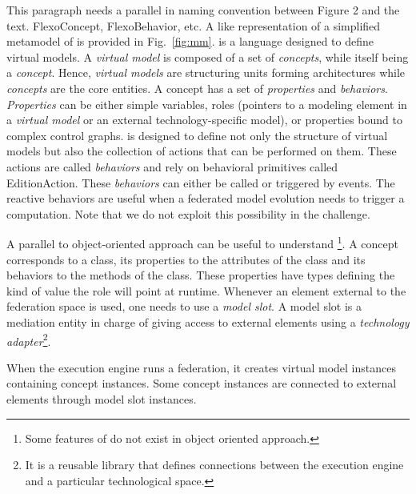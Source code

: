 {\color{red} This paragraph needs a parallel in naming convention between Figure 2 and the text.  FlexoConcept, FlexoBehavior, etc.} A \UML like representation of a simplified metamodel of \FML is provided in Fig.~\ref{fig:mm}. \FML is a language designed to define virtual models. A \emph{virtual model} is composed of a set of \emph{concepts}, while itself being a \emph{concept}. Hence, \emph{virtual models} are structuring units forming architectures while \emph{concepts} are the core entities. A concept has a set of \emph{properties} and \emph{behaviors}. \emph{Properties} can be either simple variables, roles (pointers to a modeling element in a \emph{virtual model} or an external technology-specific model), or properties bound to complex control graphs. \FML is designed to define not only the structure of virtual models but also the collection of actions that can be performed on them. These actions are called \emph{behaviors} and rely on behavioral primitives called \textsf{EditionAction}. These \emph{behaviors} can either be called or triggered by events. The reactive behaviors are useful when a federated model evolution needs to trigger a computation. Note that we do not exploit this possibility in the challenge.

A parallel to object-oriented approach can be useful to understand \FML\footnote{Some features of \FML do not exist in object oriented approach.}. A concept corresponds to a class, its properties to the attributes of the class and its behaviors to the methods of the class. These properties have types defining the kind of value the role will point at runtime. Whenever an element external to the federation space is used, one needs to use a \emph{model slot}. A model slot is a mediation entity in charge of giving access to external elements using a \emph{technology adapter}\footnote{It is a reusable library that defines connections between the \FML execution engine and a particular technological space.}.

When the \FML execution engine runs a federation, it creates virtual
model instances containing concept instances. Some concept instances
are connected to external elements through model slot instances.



